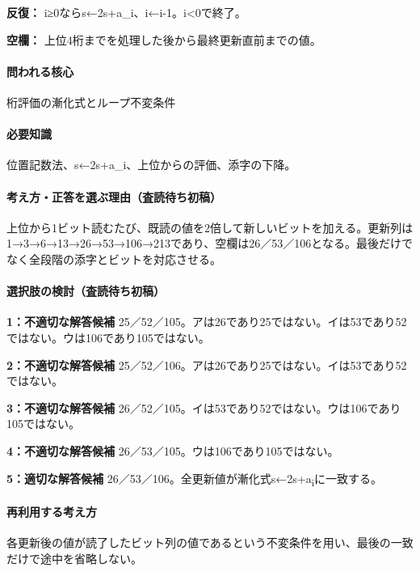 \noindent\textbf{反復：} i≥0ならs←2s+a\_i、i←i-1。i<0で終了。\par

\noindent\textbf{空欄：} 上位4桁までを処理した後から最終更新直前までの値。\par

\paragraph{問われる核心} 桁評価の漸化式とループ不変条件

\paragraph{必要知識} 位置記数法、s←2s+a\_i、上位からの評価、添字の下降。

\paragraph{考え方・正答を選ぶ理由（査読待ち初稿）} 上位から1ビット読むたび、既読の値を2倍して新しいビットを加える。更新列は1→3→6→13→26→53→106→213であり、空欄は26／53／106となる。最後だけでなく全段階の添字とビットを対応させる。

\paragraph{選択肢の検討（査読待ち初稿）}\mbox{}\par

\noindent\textbf{1：不適切な解答候補} 25／52／105。アは26であり25ではない。イは53であり52ではない。ウは106であり105ではない。\par

\noindent\textbf{2：不適切な解答候補} 25／52／106。アは26であり25ではない。イは53であり52ではない。\par

\noindent\textbf{3：不適切な解答候補} 26／52／105。イは53であり52ではない。ウは106であり105ではない。\par

\noindent\textbf{4：不適切な解答候補} 26／53／105。ウは106であり105ではない。\par

\noindent\textbf{5：適切な解答候補} 26／53／106。全更新値が漸化式s←2s+a\textsubscript{i}に一致する。\par

\paragraph{再利用する考え方} 各更新後の値が読了したビット列の値であるという不変条件を用い、最後の一致だけで途中を省略しない。

